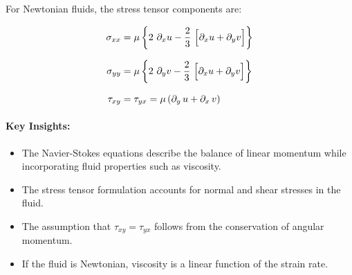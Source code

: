 For Newtonian fluids, the stress tensor components are:

\[
\begin{aligned}
    \sigma_{xx} & = \mu \left\{2\,\, \partial_x u -\frac{2}{3}\,\,\Bigl[\partial_x u+\partial_y v\Bigr] \right\}
    \\[0.7em]
    \sigma_{yy} & = \mu \left\{2\,\, \partial_y v -\frac{2}{3}\,\,\Bigl[\partial_x u+\partial_y v\Bigr] \right\}
    \\[0.7em]
    \tau_{xy} & = \tau_{yx} = \mu \left( \partial_y\,u + \partial_x \,v \right)
\end{aligned}
\]
%
\paragraph{Key Insights:}
\begin{itemize}
    \item The Navier-Stokes equations describe the balance of linear momentum while incorporating fluid properties such as viscosity.
    \item The stress tensor formulation accounts for normal and shear stresses in the fluid.
    \item The assumption that $\tau_{xy} = \tau_{yx}$ follows from the conservation of angular momentum.
    \item If the fluid is Newtonian, viscosity is a linear function of the strain rate.
\end{itemize}

